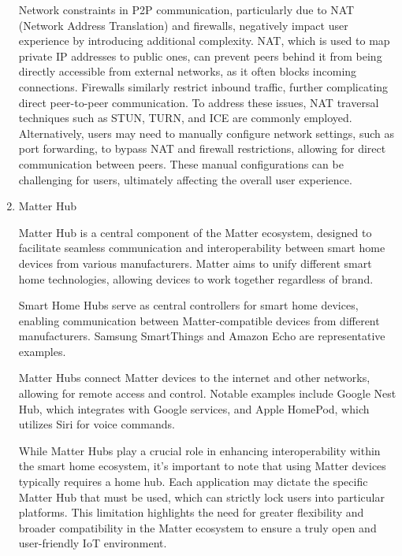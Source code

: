 \documentclass[conference]{IEEEtran}
\begin{document}
\begin{enumerate}[itemsep=2ex, parsep=1ex]
	      Network constraints in P2P communication, particularly due to NAT (Network
	      Address Translation) and firewalls, negatively impact user experience by introducing
	      additional complexity. NAT, which is used to map private IP addresses to public
	      ones, can prevent peers behind it from being directly accessible from
	      external networks, as it often blocks incoming connections. Firewalls
	      similarly restrict inbound traffic, further complicating direct peer-to-peer
	      communication. To address these issues, NAT traversal techniques such as STUN,
	      TURN, and ICE are commonly employed. Alternatively, users may need to manually
	      configure network settings, such as port forwarding, to bypass NAT and firewall
	      restrictions, allowing for direct communication between peers. These manual
	      configurations can be challenging for users, ultimately affecting the
	      overall user experience.
	      	      	      
	\item Matter Hub
	      	      	      
	      Matter Hub is a central component of the Matter ecosystem, designed to facilitate
	      seamless communication and interoperability between smart home devices from
	      various manufacturers. Matter aims to unify different smart home
	      technologies, allowing devices to work together regardless of brand.
	      	      	      
	      Smart Home Hubs serve as central controllers for smart home devices,
	      enabling communication between Matter-compatible devices from different
	      manufacturers. Samsung SmartThings and Amazon Echo are representative examples.
	      	      	      
	      Matter Hubs connect Matter devices to the internet and other networks,
	      allowing for remote access and control. Notable examples include Google Nest
	      Hub, which integrates with Google services, and Apple HomePod, which
	      utilizes Siri for voice commands.
	      	      	      
	      While Matter Hubs play a crucial role in enhancing interoperability within
	      the smart home ecosystem, it's important to note that using Matter devices
	      typically requires a home hub. Each application may dictate the specific
	      Matter Hub that must be used, which can strictly lock users into particular
	      platforms. This limitation highlights the need for greater flexibility and
	      broader compatibility in the Matter ecosystem to ensure a truly open and
	      user-friendly IoT environment.
	      	      	      

\end{enumerate}
\end{document}
